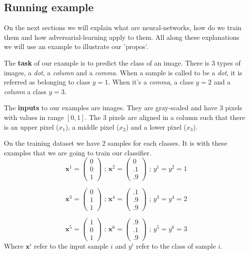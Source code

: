 	\subsection{Running example}
		On the next sections we will explain what are neural-networks, how do we train them and how adversarial-learning apply to them. All along these explanations we will use an example to illustrate our 'propos'.


		The \textbf{task} of our example is to predict the class of an image. There is 3 types of images, a \textit{dot}, a \textit{column} and a \textit{comma}. When a sample is called to be a \textit{dot}, it is referred as belonging to class $y=1$. When it's a \textit{comma}, a class $y=2$ and a \textit{column} a class $y=3$.

		The \textbf{inputs} to our examples are images. They are gray-scaled and have 3 pixels with values in range $[0,1]$. The 3 pixels are aligned in a column such that there is an upper pixel ($x_1$), a middle pixel ($x_2$) and a lower pixel ($x_3$). 

		On the training dataset we have 2 samples for each classes. It is with these examples that we are going to train our classifier.
		$$ \boldsymbol{x}^1 = \left( \begin{matrix} 0  \\ 0  \\ 1  \end{matrix}\right) \text{ ; }
		   \boldsymbol{x}^2 = \left( \begin{matrix} 0  \\ .1 \\ .9 \end{matrix}\right) \text{ ; }
		   y^1 = y^2 = 1 $$

		$$ \boldsymbol{x}^3 = \left( \begin{matrix} 0  \\ 1  \\ 1  \end{matrix}\right) \text{ ; }
		   \boldsymbol{x}^4 = \left( \begin{matrix} .1 \\ .9 \\ .9 \end{matrix}\right) \text{ ; }
		   y^3 = y^4 = 2 $$

		$$ \boldsymbol{x}^5 = \left( \begin{matrix} 1  \\ 0  \\ 1  \end{matrix}\right) \text{ ; }
		   \boldsymbol{x}^6 = \left( \begin{matrix} .9 \\ .1 \\ .9 \end{matrix}\right) \text{ ; }
		   y^5 = y^6 = 3 $$
		Where $\boldsymbol{x}^i$ refer to the input sample $i$ and $y^i$ refer to the class of sample $i$.

